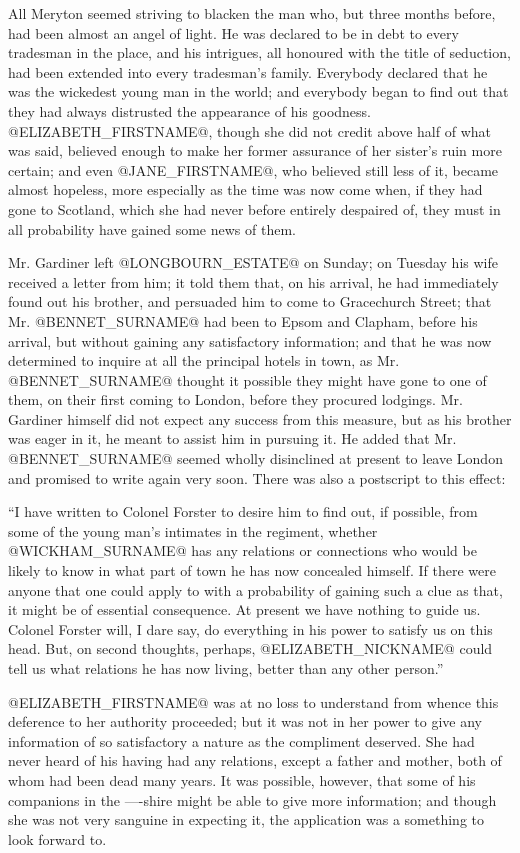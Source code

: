 All Meryton seemed striving to blacken the man who, but three months
before, had been almost an angel of light. He was declared to be in debt
to every tradesman in the place, and his intrigues, all honoured with
the title of seduction, had been extended into every tradesman's family.
Everybody declared that he was the wickedest young man in the world;
and everybody began to find out that they had always distrusted the
appearance of his goodness. @ELIZABETH_FIRSTNAME@, though she did not credit above
half of what was said, believed enough to make her former assurance of
her sister's ruin more certain; and even @JANE_FIRSTNAME@, who believed still less
of it, became almost hopeless, more especially as the time was now come
when, if they had gone to Scotland, which she had never before entirely
despaired of, they must in all probability have gained some news of
them.

Mr. Gardiner left @LONGBOURN_ESTATE@ on Sunday; on Tuesday his wife received a
letter from him; it told them that, on his arrival, he had immediately
found out his brother, and persuaded him to come to Gracechurch Street;
that Mr. @BENNET_SURNAME@ had been to Epsom and Clapham, before his arrival,
but without gaining any satisfactory information; and that he was now
determined to inquire at all the principal hotels in town, as Mr. @BENNET_SURNAME@
thought it possible they might have gone to one of them, on their first
coming to London, before they procured lodgings. Mr. Gardiner himself
did not expect any success from this measure, but as his brother was
eager in it, he meant to assist him in pursuing it. He added that Mr.
@BENNET_SURNAME@ seemed wholly disinclined at present to leave London and promised
to write again very soon. There was also a postscript to this effect:

``I have written to Colonel Forster to desire him to find out, if
possible, from some of the young man's intimates in the regiment,
whether @WICKHAM_SURNAME@ has any relations or connections who would be likely to
know in what part of town he has now concealed himself. If there were
anyone that one could apply to with a probability of gaining such a
clue as that, it might be of essential consequence. At present we have
nothing to guide us. Colonel Forster will, I dare say, do everything in
his power to satisfy us on this head. But, on second thoughts, perhaps,
@ELIZABETH_NICKNAME@ could tell us what relations he has now living, better than any
other person.''

@ELIZABETH_FIRSTNAME@ was at no loss to understand from whence this deference to her
authority proceeded; but it was not in her power to give any information
of so satisfactory a nature as the compliment deserved. She had never
heard of his having had any relations, except a father and mother, both
of whom had been dead many years. It was possible, however, that some of
his companions in the ----shire might be able to give more information;
and though she was not very sanguine in expecting it, the application
was a something to look forward to.

